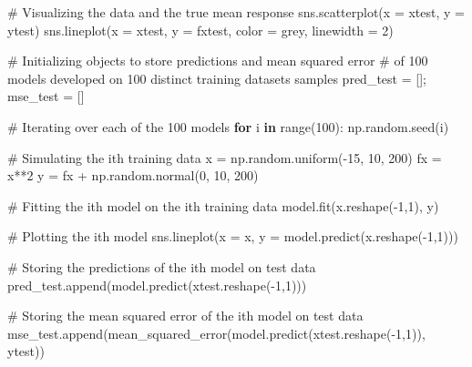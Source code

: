 \documentclass[
  letterpaper,
  DIV=11,
  numbers=noendperiod]{scrreprt}
\newenvironment{Shaded}{\begin{snugshade}}{\end{snugshade}}
\newcommand{\BuiltInTok}[1]{\textcolor[rgb]{0.00,0.23,0.31}{#1}}
\newcommand{\CommentTok}[1]{\textcolor[rgb]{0.37,0.37,0.37}{#1}}
\newcommand{\ControlFlowTok}[1]{\textcolor[rgb]{0.00,0.23,0.31}{\textbf{#1}}}
\newcommand{\DecValTok}[1]{\textcolor[rgb]{0.68,0.00,0.00}{#1}}
\newcommand{\KeywordTok}[1]{\textcolor[rgb]{0.00,0.23,0.31}{\textbf{#1}}}
\newcommand{\NormalTok}[1]{\textcolor[rgb]{0.00,0.23,0.31}{#1}}
\newcommand{\OperatorTok}[1]{\textcolor[rgb]{0.37,0.37,0.37}{#1}}
\newcommand{\StringTok}[1]{\textcolor[rgb]{0.13,0.47,0.30}{#1}}
\begin{document}
\begin{Shaded}
\begin{Highlighting}[]
\CommentTok{\# Visualizing the data and the true mean response}
\NormalTok{sns.scatterplot(x }\OperatorTok{=}\NormalTok{ xtest, y }\OperatorTok{=}\NormalTok{ ytest)}
\NormalTok{sns.lineplot(x }\OperatorTok{=}\NormalTok{ xtest, y }\OperatorTok{=}\NormalTok{ fxtest, color }\OperatorTok{=} \StringTok{\textquotesingle{}grey\textquotesingle{}}\NormalTok{, linewidth }\OperatorTok{=} \DecValTok{2}\NormalTok{)}

\CommentTok{\# Initializing objects to store predictions and mean squared error}
\CommentTok{\# of 100 models developed on 100 distinct training datasets samples}
\NormalTok{pred\_test }\OperatorTok{=}\NormalTok{ []}\OperatorTok{;}\NormalTok{ mse\_test }\OperatorTok{=}\NormalTok{ []}

\CommentTok{\# Iterating over each of the 100 models}
\ControlFlowTok{for}\NormalTok{ i }\KeywordTok{in} \BuiltInTok{range}\NormalTok{(}\DecValTok{100}\NormalTok{):}
\NormalTok{    np.random.seed(i)}
    
    \CommentTok{\# Simulating the ith training data}
\NormalTok{    x }\OperatorTok{=}\NormalTok{ np.random.uniform(}\OperatorTok{{-}}\DecValTok{15}\NormalTok{, }\DecValTok{10}\NormalTok{, }\DecValTok{200}\NormalTok{)}
\NormalTok{    fx }\OperatorTok{=}\NormalTok{ x}\OperatorTok{**}\DecValTok{2}
\NormalTok{    y }\OperatorTok{=}\NormalTok{ fx }\OperatorTok{+}\NormalTok{ np.random.normal(}\DecValTok{0}\NormalTok{, }\DecValTok{10}\NormalTok{, }\DecValTok{200}\NormalTok{)}
    
    \CommentTok{\# Fitting the ith model on the ith training data}
\NormalTok{    model.fit(x.reshape(}\OperatorTok{{-}}\DecValTok{1}\NormalTok{,}\DecValTok{1}\NormalTok{), y)}
    
    \CommentTok{\# Plotting the ith model}
\NormalTok{    sns.lineplot(x }\OperatorTok{=}\NormalTok{ x, y }\OperatorTok{=}\NormalTok{ model.predict(x.reshape(}\OperatorTok{{-}}\DecValTok{1}\NormalTok{,}\DecValTok{1}\NormalTok{)))}
    
    \CommentTok{\# Storing the predictions of the ith model on test data}
\NormalTok{    pred\_test.append(model.predict(xtest.reshape(}\OperatorTok{{-}}\DecValTok{1}\NormalTok{,}\DecValTok{1}\NormalTok{)))}
    
    \CommentTok{\# Storing the mean squared error of the ith model on test data}
\NormalTok{    mse\_test.append(mean\_squared\_error(model.predict(xtest.reshape(}\OperatorTok{{-}}\DecValTok{1}\NormalTok{,}\DecValTok{1}\NormalTok{)), ytest))}
\end{Highlighting}
\end{Shaded}
\end{document}
